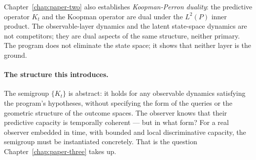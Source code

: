 Chapter~\ref{chap:paper-two} also establishes \emph{Koopman-Perron
duality}: the predictive operator $K_t$ and the Koopman operator are
dual under the $L^2(P)$ inner product.  The observable-layer dynamics
and the latent state-space dynamics are not competitors; they are dual
aspects of the same structure, neither primary.  The program does not
eliminate the state space; it shows that neither layer is the ground.

\medskip

\paragraph{The structure this introduces.}
The semigroup $\{K_t\}$ is abstract: it holds for any observable
dynamics satisfying the program's hypotheses, without specifying the
form of the queries or the geometric structure of the outcome spaces.
The observer knows that their predictive capacity is temporally
coherent --- but in what form?  For a real observer embedded in time,
with bounded and local discriminative capacity, the semigroup must be
instantiated concretely.  That is the question Chapter~\ref{chap:paper-three}
takes up.
